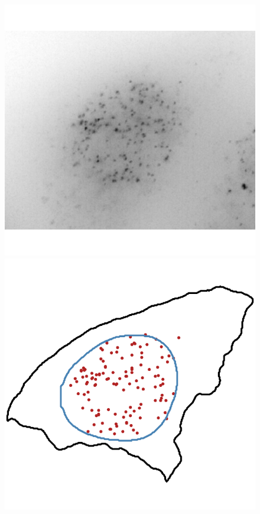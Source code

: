 \begin{figure}[]
	\endminipage\hfill
		\includegraphics[width=0.95\linewidth]{figures/introduction/real_image_intranuclear}
		\vfill
		\includegraphics[width=0.95\linewidth]{figures/introduction/real_coord_intranuclear}
	\endminipage\hfill

\end{figure}
